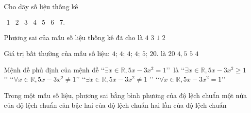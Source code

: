 	\begin{ex}%
		Cho dãy số liệu thống kê
		\begin{center}
		$\begin{array}{llllllll}1 & 2 & 3 & 4 & 5 & 6 &7.\end{array}$
		\end{center}
		Phương sai của mẫu số liệu thống kê đã cho là
		\choice
		{\True $4$}
		{$3$}
		{$1$}
		{$2$}
	\end{ex}
	\begin{ex}%
		Giá trị bất thường của mẫu số liệu: $4$; $4$; $4$; $4$; $5$; $20$. là
		\choice
		{\True $20$}
		{$4{,}5$}
		{$5$}
		{$4$}
	\end{ex}
\begin{ex}%
	Mệnh đề phủ định của mệnh đề \lq\lq$\exists x\in\mathbb{R}, 5 x-3x^2=1$\rq\rq ~là
	\choice
	{\lq\lq$\exists x \in \mathbb{R}, 5x-3x^2\geq 1$\rq\rq}
	{\True \lq\lq $\forall x \in \mathbb{R}, 5x-3x^2 \neq 1$\rq\rq}
	{\lq\lq $\exists x \in \mathbb{R}, 5x-3x^2 \neq 1$ \rq\rq}
	{\lq\lq$\forall x \in \mathbb{R}, 5x-3x^2=1$\rq\rq}
\end{ex}
	\begin{ex}%
		Trong một mẫu số liệu, phương sai bằng
		\choice
		{\True bình phương của độ lệch chuẩn}
		{một nửa của độ lệch chuẩn}
		{căn bậc hai của độ lệch chuẩn}
		{hai lần của độ lệch chuẩn}
	\end{ex}
